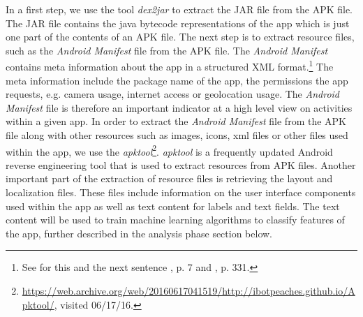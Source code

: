 In a first step, we use the tool \textit{dex2jar} to extract the \acs{JAR} file from the APK file.
The JAR file contains the java bytecode representations of the app which is just one part of the contents of an \acs{APK} file.
The next step is to extract resource files, such as the \textit{Android Manifest} file from the APK file.
The \textit{Android Manifest} contains meta information about the app in a structured XML format.\footnote{See for this and the next sentence \cite{xu2013}, p. 7 and \cite{Shabtai2010}, p. 331.}
The meta information include the package name of the app, the permissions the app requests, e.g. camera usage, internet access or geolocation usage.
The \textit{Android Manifest} file is therefore an important indicator at a high level view on activities within a given app.
In order to extract the \textit{Android Manifest} file from the APK file along with other resources such as images, icons, xml files or other files used within the app, we use the \textit{apktool}\footnote{\url{https://web.archive.org/web/20160617041519/http://ibotpeaches.github.io/Apktool/}, visited 06/17/16.}.
\textit{apktool} is a frequently updated Android reverse engineering tool that is used to extract resources from APK files.
Another important part of the extraction of resource files is retrieving the layout and localization files.
These files include information on the user interface components used within the app as well as text content for labels and text fields.
The text content will be used to train machine learning algorithms to classify features of the app, further described in the analysis phase section below.

